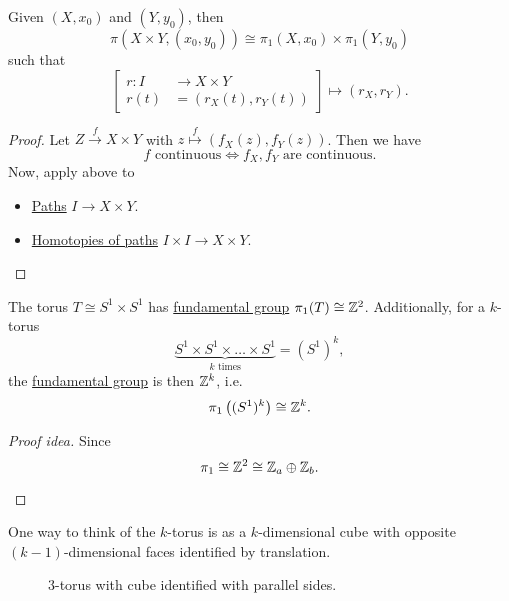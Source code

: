 \begin{theorem}
	Given \((X, x_0)\) and \((Y, y_0)\), then
	\[
		\pi (X\times Y, (x_0, y_0)) \cong \pi_1(X, x_0)\times \pi _1(Y, y_0)
	\]
	such that
	\[
		\left[\begin{alignedat}{3}
				r\colon I&\to X\times Y\\
				r(t) &= \left(r_X(t), r_Y(t)\right)
			\end{alignedat}\right] \mapsto (r_{X}, r_{Y}).
	\]
\end{theorem}
\begin{proof}
	Let \(Z\overset{f}{\to} X\times Y\) with \(z\overset{f}{\mapsto} \left(f_{X}(z), f_{Y}(z)\right)\). Then we have
	\[
		f\text{ continuous}\iff f_{X}, f_{Y}  \text{ are continuous}.
	\]
	Now, apply above to
	\begin{itemize}
		\item \hyperref[def:path]{Paths} \(I\to X\times Y\).
		\item \hyperref[def:homotopy-path]{Homotopies of paths} \(I\times I\to X\times Y\).
	\end{itemize}
\end{proof}

\begin{corollary}
	The torus \(T\cong S^{1}\times S^1\) has \hyperref[def:fundamental-group]{fundamental group} \(\pi _1(T)\cong \mathbb{\MakeUppercase{z}} ^2\). Additionally,
	for a \(k\)-torus
	\[
		\underbrace{S^{1}\times S^1 \times \ldots \times S^1}_{k\text{ times}} = (S^1)^k,
	\]
	the \hyperref[def:fundamental-group]{fundamental group}
	is then \(\mathbb{\MakeUppercase{z}} ^k\), i.e.
	\[
		\pi _1\left((S^1)^k\right) \cong \mathbb{\MakeUppercase{z}} ^k.
	\]
\end{corollary}
\begin{proof}[Proof idea]
	Since
	\[
		\pi _1 \cong \mathbb{\MakeUppercase{z}}^2 \cong \mathbb{\MakeUppercase{z}} _a \oplus \mathbb{\MakeUppercase{z}} _b.
	\]
	\begin{figure}[H]
		\centering
		\label{fig:pf:torus-fundamental-group}
	\end{figure}
\end{proof}
\begin{remark}
	One way to think of the \(k\)-torus is as a \(k\)-dimensional cube with opposite \((k-1)\)-dimensional faces identified by translation.
	\begin{figure}[H]
		\centering
		\caption{\(3\)-torus with cube identified with parallel sides.}
		\label{fig:3-torus}
	\end{figure}
\end{remark}


